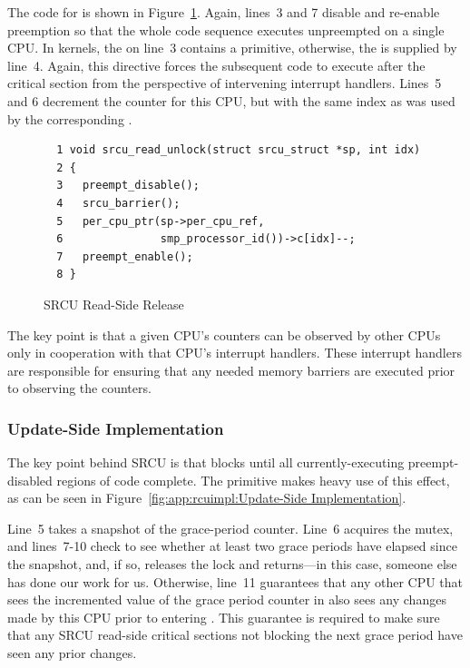 The code for  is shown in
Figure~\ref{fig:app:rcuimpl:Read-Side Release}.
Again, lines~3 and 7 disable and re-enable preemption so that the
whole code sequence executes unpreempted on a single CPU.
In  kernels, the  on line~3
contains a  primitive, otherwise, the 
is supplied by line~4.
Again, this directive forces the subsequent code to execute after
the critical section from the perspective of intervening
interrupt handlers.
Lines~5 and 6 decrement the counter for this CPU, but with the same
index as was used by the corresponding .

\begin{figure}[htbp]
{ \scriptsize
\begin{verbatim}
  1 void srcu_read_unlock(struct srcu_struct *sp, int idx)
  2 {
  3   preempt_disable();
  4   srcu_barrier();
  5   per_cpu_ptr(sp->per_cpu_ref,
  6               smp_processor_id())->c[idx]--;
  7   preempt_enable();
  8 }
\end{verbatim}
}
\caption{SRCU Read-Side Release}
\label{fig:app:rcuimpl:Read-Side Release}
\end{figure}

The key point is that a given CPU's counters
can be observed by other CPUs only in
cooperation with that CPU's interrupt handlers.
These interrupt handlers are responsible for ensuring that any needed
memory barriers are executed prior to observing the counters.

\subsubsection{Update-Side Implementation}
\label{sec:app:rcuimpl:Update-Side Implementation}

The key point behind SRCU is that 
blocks until all currently-executing preempt-disabled regions of
code complete.
The  primitive makes heavy use of this effect,
as can be seen in
Figure~\ref{fig:app:rcuimpl:Update-Side Implementation}.

Line~5 takes a snapshot of the grace-period counter.
Line~6 acquires the mutex, and lines~7-10 check to see whether
at least two grace periods have elapsed since the snapshot,
and, if so, releases the lock and returns---in this case, someone
else has done our work for us.
Otherwise, line~11 guarantees that any other CPU that sees the
incremented value of the grace period counter in 
also sees any changes made by this CPU prior to entering
.
This guarantee is required to make sure that any SRCU read-side
critical sections not blocking the next grace period have seen
any prior changes.

